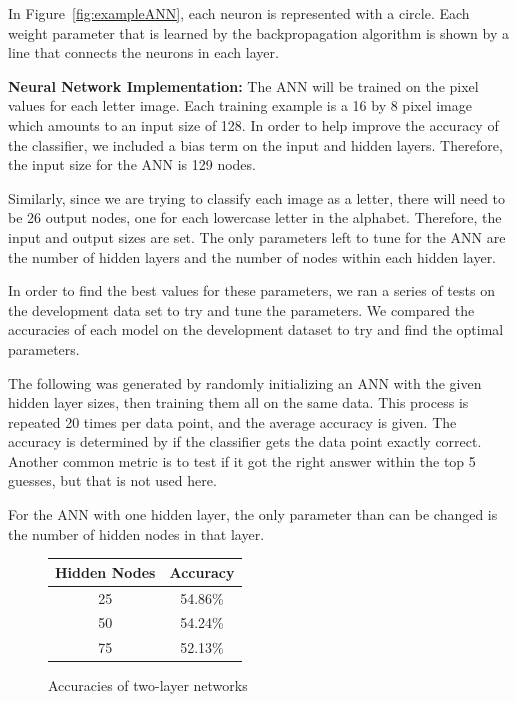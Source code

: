 \documentclass[11pt,letterpaper]{article}
\begin{document}
In Figure~\ref{fig:exampleANN}, each neuron is represented with a circle. Each weight parameter that is learned by the
backpropagation algorithm is shown by a line that connects the neurons in each layer.

{\bf Neural Network Implementation:} The ANN will be trained on the pixel values for each letter image. Each training example is a 16 by
8 pixel image which amounts to an input size of 128. In order to help improve the accuracy of the
classifier, we included a bias term on the input and hidden layers. Therefore, the input size for
the ANN is 129 nodes.

Similarly, since we are trying to classify each image as a letter, there will need to be 26 output
nodes, one for each lowercase letter in the alphabet. Therefore, the input and output sizes are set.
The only parameters left to tune for the ANN are the number of hidden layers and the number of nodes
within each hidden layer.

In order to find the best values for these parameters, we ran a series of tests on the development
data set to try and tune the parameters. We compared the accuracies of each model on the development
dataset to try and find the optimal parameters.

The following was generated by randomly initializing an ANN with the given hidden layer sizes, then
training them all on the same data. This process is repeated 20 times per data point, and the
average accuracy is given. The accuracy is determined by if the classifier gets the data point
exactly correct. Another common metric is to test if it got the right answer within the top 5
guesses, but that is not used here.

For the ANN with one hidden layer, the only parameter than can be changed is the number of hidden nodes in that layer.

\begin{figure}[h]
    \caption{Accuracies of two-layer networks}
    \centering
    \begin{tabular}{|c|c|}
        \hline 
        Hidden Nodes & Accuracy \\ 
        \hline 
        25 & 54.86\% \\ 
        \hline 
        50 & 54.24\% \\ 
        \hline 
        75 & 52.13\% \\ 
        \hline 
    \end{tabular} 
\end{figure}
\end{document}
